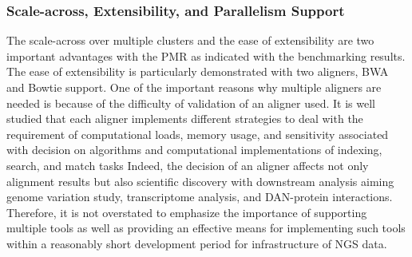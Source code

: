 \documentclass{acm_proc_article-sp}
\begin{document}
%

\subsubsection{Scale-across, Extensibility, and Parallelism Support}
The scale-across over multiple clusters and the ease of extensibility are two important advantages with the PMR as indicated with the benchmarking results.  The ease of extensibility is particularly demonstrated with two aligners, BWA and Bowtie support.  One of the important reasons why multiple aligners are needed is because of the difficulty of validation of an aligner used.  It is well studied that each aligner implements different strategies to deal with the requirement of computational loads, memory usage, and sensitivity associated with decision on algorithms and computational implementations of indexing, search, and match tasks\cite{mapping-survey}   Indeed, the decision of an aligner affects not only alignment results but also scientific discovery with downstream analysis aiming genome variation study, transcriptome analysis, and DAN-protein interactions. Therefore, it is not overstated to emphasize the importance of supporting multiple tools as well as providing an effective means for implementing such tools within a reasonably short development period for infrastructure of NGS data. 
\end{document}
